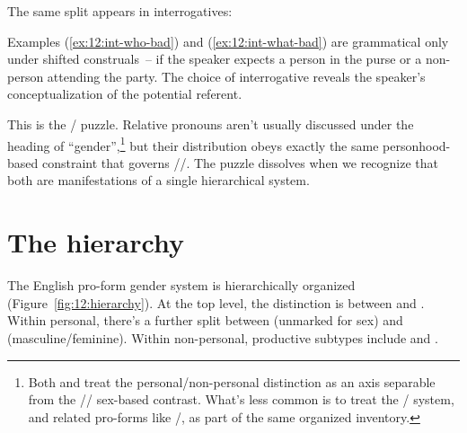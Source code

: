 The same split appears in interrogatives:

\z
{}
\z
{}
\z
{}
\z
Examples (\ref{ex:12:int-who-bad}) and (\ref{ex:12:int-what-bad}) are grammatical only under shifted construals~-- if the speaker expects a person in the purse or a non-person attending the party. The choice of interrogative reveals the speaker's conceptualization of the potential referent.

This is the / puzzle. Relative pronouns aren't usually discussed under the heading of \enquote{gender},\footnote{Both \textcite{huddleston2002} and \textcite{quirk1985} treat the personal/non-personal distinction as an axis separable from the // sex-based contrast. What's less common is to treat the / system, and related pro-forms like /, as part of the same organized inventory.} but their distribution obeys exactly the same personhood-based constraint that governs //. The puzzle dissolves when we recognize that both are manifestations of a single hierarchical system.

\section{The hierarchy}
\label{sec:12:hierarchy}

The English pro-form gender system is hierarchically organized (Figure~\ref{fig:12:hierarchy}). At the top level, the distinction is between  and . Within personal, there's a further split between  (unmarked for sex) and  (masculine/feminine). Within non-personal, productive subtypes include  and .

